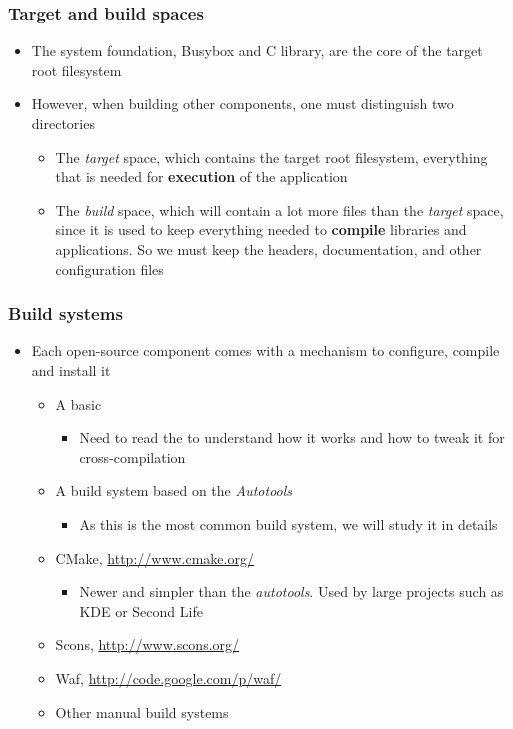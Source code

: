 \begin{frame}
  \frametitle{Target and build spaces}
  \begin{itemize}
  \item The system foundation, Busybox and C library, are the core of
    the target root filesystem
  \item However, when building other components, one must distinguish
    two directories
    \begin{itemize}
    \item The {\em target} space, which contains the target root
      filesystem, everything that is needed for {\bf execution} of the
      application
    \item The {\em build} space, which will contain a lot more files
      than the {\em target} space, since it is used to keep everything
      needed to {\bf compile} libraries and applications. So we must
      keep the headers, documentation, and other configuration files
    \end{itemize}
  \end{itemize}
\end{frame}

\begin{frame}
  \frametitle{Build systems}
  \begin{itemize}
  \item Each open-source component comes with a mechanism to
    configure, compile and install it
    \begin{itemize}
    \item A basic 
      \begin{itemize}
      \item Need to read the  to understand how it
        works and how to tweak it for cross-compilation
      \end{itemize}
    \item A build system based on the {\em Autotools}
      \begin{itemize}
      \item As this is the most common build system, we will study it
        in details
      \end{itemize}
    \item CMake, \url{http://www.cmake.org/}
      \begin{itemize}
      \item Newer and simpler than the {\em autotools}. Used by large
        projects such as KDE or Second Life
      \end{itemize}
    \item Scons, \url{http://www.scons.org/}
    \item Waf, \url{http://code.google.com/p/waf/}
    \item Other manual build systems
    \end{itemize}
  \end{itemize}
\end{frame}

